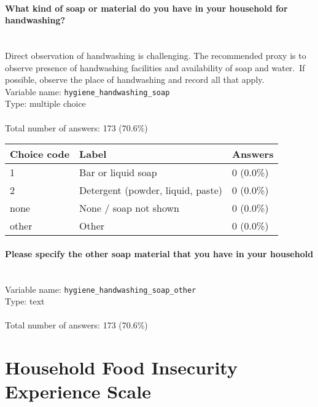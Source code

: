 \documentclass[11.5pt, a4paper]{scrartcl}
\begin{document}
\paragraph{What kind of soap or material do you have in your household for handwashing? }
\ \\ {\small Direct observation of handwashing is challenging. The recommended proxy is to observe presence of handwashing facilities and availability of soap and water. If possible, observe the place of handwashing and record all that apply.}
\  \\Variable name: \texttt{hygiene\_handwashing\_soap}\\
Type: multiple choice\\
\\Total number of answers: 173 (70.6\%)
\\[0.2em] \begin{tabular}{p{4cm}|p{8cm}|p{3cm}}
Choice code & Label & Answers \\
\hline
1 & Bar or liquid soap& \cellcolor{color0}0 (0.0\%)\\
\cellcolor{mygray} 2 & \cellcolor{mygray}Detergent (powder, liquid, paste) & \cellcolor{color0}0 (0.0\%)\\
none & None / soap not shown& \cellcolor{color0}0 (0.0\%)\\
\cellcolor{mygray} other & \cellcolor{mygray}Other & \cellcolor{color0}0 (0.0\%)\\
\end{tabular}
\paragraph{Please specify the other soap material that you have in your household}
\  \\Variable name: \texttt{hygiene\_handwashing\_soap\_other}\\
Type: text\\
\\Total number of answers: 173 (70.6\%)
\\[0.2em]\newpage\section{Household Food Insecurity Experience Scale }
\end{document}
